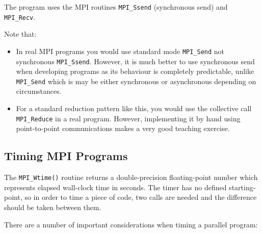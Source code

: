 \documentclass{article}
\begin{document}
  The program uses the MPI routines {\tt MPI\_Ssend} (synchronous send) and {\tt MPI\_Recv}.

Note that:

\begin{itemize}

  \item In real MPI programs you would use standard mode
    \texttt{MPI\_Send} not synchronous \texttt{MPI\_Ssend}. However, it is much better to use synchronous
    send when developing programs as its behaviour is completely
    predictable, unlike \texttt{MPI\_Send} which is may be either
    synchronous or asynchronous depending on circumstances.

    \item For a standard reduction pattern like this, you would use
      the collective call \texttt{MPI\_Reduce} in a real
      program. However, implementing it by hand using point-to-point
      communications makes a very good teaching exercise.

\end{itemize}

\subsection{Timing MPI Programs}

The {\tt MPI\_Wtime()} routine returns a double-precision floating-point
number which represents elapsed wall-clock time in seconds. The timer
has no defined starting-point, so in order to time a piece of code, two
calls are needed and the difference should be taken between them.

There are a number of important considerations when timing a
parallel program:
\end{document}
